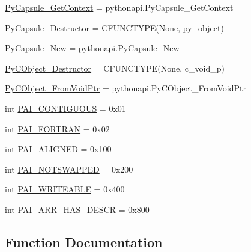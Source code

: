 \begin{DoxyCompactItemize}
\item 
\hyperlink{namespacepygame_1_1tests_1_1test__utils_1_1arrinter_a1daec48314e21a6cb1f54be745d2c280}{Py\+Capsule\+\_\+\+Get\+Context} = pythonapi.\+Py\+Capsule\+\_\+\+Get\+Context
\item 
\hyperlink{namespacepygame_1_1tests_1_1test__utils_1_1arrinter_a9448dbe521a14eaad04d601114947be5}{Py\+Capsule\+\_\+\+Destructor} = C\+F\+U\+N\+C\+T\+Y\+PE(None, py\+\_\+object)
\item 
\hyperlink{namespacepygame_1_1tests_1_1test__utils_1_1arrinter_a2202e49ab6c7dae5a7b354133d2867c1}{Py\+Capsule\+\_\+\+New} = pythonapi.\+Py\+Capsule\+\_\+\+New
\item 
\hyperlink{namespacepygame_1_1tests_1_1test__utils_1_1arrinter_a72b2cb1478a5a66efe953bb57fbc7c68}{Py\+C\+Object\+\_\+\+Destructor} = C\+F\+U\+N\+C\+T\+Y\+PE(None, c\+\_\+void\+\_\+p)
\item 
\hyperlink{namespacepygame_1_1tests_1_1test__utils_1_1arrinter_a618b5cc922e7b0d6c2bf979bfa4e953b}{Py\+C\+Object\+\_\+\+From\+Void\+Ptr} = pythonapi.\+Py\+C\+Object\+\_\+\+From\+Void\+Ptr
\item 
int \hyperlink{namespacepygame_1_1tests_1_1test__utils_1_1arrinter_a1828b59d0394a167c6c070da429f78c5}{P\+A\+I\+\_\+\+C\+O\+N\+T\+I\+G\+U\+O\+US} = 0x01
\item 
int \hyperlink{namespacepygame_1_1tests_1_1test__utils_1_1arrinter_ae03a4fbeffad79cc1392b8a78bcb8714}{P\+A\+I\+\_\+\+F\+O\+R\+T\+R\+AN} = 0x02
\item 
int \hyperlink{namespacepygame_1_1tests_1_1test__utils_1_1arrinter_ab16146aa9fd7550421da9da22f19df9a}{P\+A\+I\+\_\+\+A\+L\+I\+G\+N\+ED} = 0x100
\item 
int \hyperlink{namespacepygame_1_1tests_1_1test__utils_1_1arrinter_ada703e7daf2ac91b7b6ac5aa3e73676b}{P\+A\+I\+\_\+\+N\+O\+T\+S\+W\+A\+P\+P\+ED} = 0x200
\item 
int \hyperlink{namespacepygame_1_1tests_1_1test__utils_1_1arrinter_a0e4a705fdb7842715823694009da0ef9}{P\+A\+I\+\_\+\+W\+R\+I\+T\+E\+A\+B\+LE} = 0x400
\item 
int \hyperlink{namespacepygame_1_1tests_1_1test__utils_1_1arrinter_abf401eb60fd3e1469af71314c35e3946}{P\+A\+I\+\_\+\+A\+R\+R\+\_\+\+H\+A\+S\+\_\+\+D\+E\+S\+CR} = 0x800
\end{DoxyCompactItemize}


\subsection{Function Documentation}
\mbox{\label{namespacepygame_1_1tests_1_1test__utils_1_1arrinter_a2bec215da96fb0d84940b3de32664e6d}} 
